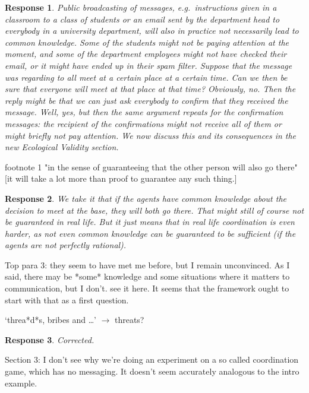 \documentclass[a4paper]{article}
\newtheorem{response}{Response}
\begin{document}
\begin{response}
Public broadcasting of messages, e.g.\ instructions given in a classroom to a class of students or an email sent by the department head to everybody in a university department, will also in practice not necessarily lead to common knowledge. Some of the students might not be paying attention at the moment, and some of the department employees might not have checked their email, or it might have ended up in their spam filter. Suppose that the message was regarding to all meet at a certain place at a certain time. Can we then be sure that everyone will meet at that place at that time? Obviously, no. Then the reply might be that we can just ask everybody to confirm that they received the message. Well, yes, but then the same argument repeats for the confirmation messages: the recipient of the confirmations might not receive all of them or might briefly not pay attention. We now discuss this and its consequences in the new Ecological Validity section. 
\end{response}

footnote 1 "in the sense of guaranteeing that the other person will also go there" [it will take a lot more than proof to guarantee any such thing.]

\begin{response}
We take it that if the agents have common knowledge about the decision to meet at the base, they \emph{will} both go there. That might still of course not be guaranteed in real life. But it just means that in real life coordination is even harder, as not even common knowledge can be guaranteed to be sufficient (if the agents are not perfectly rational).
\end{response}


Top para 3: they seem to have met me before, but I remain unconvinced. As I said, there may be *some* knowledge and some situations where it matters to communication, but I don't. see it here. It seems that the framework ought to start with that as a first question.


`threa*d*s, bribes and …' $\to$ threats?
\begin{response} Corrected. \end{response}

Section 3: I don't see why we're doing an experiment on a so called coordination game, which has no messaging. It doesn't seem accurately analogous to the intro example. 
\end{document}
